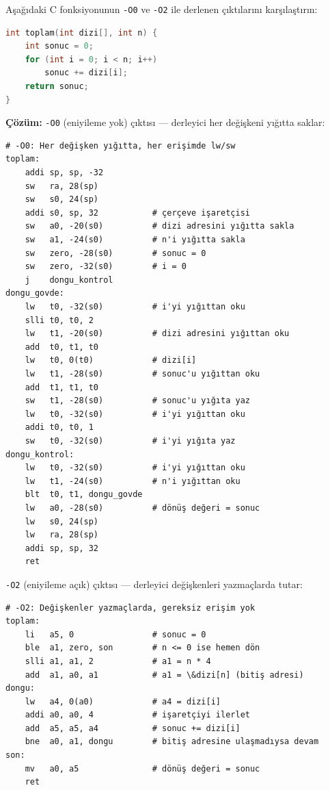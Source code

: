 \begin{ornek}[4.16]
\label{orn:eniyileme}
Aşağıdaki C fonksiyonunun \texttt{-O0} ve \texttt{-O2} ile derlenen çıktılarını karşılaştırın:

\begin{lstlisting}[language=C, style=alistirma-kod]
int toplam(int dizi[], int n) {
    int sonuc = 0;
    for (int i = 0; i < n; i++)
        sonuc += dizi[i];
    return sonuc;
}
\end{lstlisting}

\textbf{Çözüm:} \texttt{-O0} (eniyileme yok) çıktısı --- derleyici her değişkeni yığıtta saklar:

\begin{lstlisting}[style=riscv]
# -O0: Her değişken yığıtta, her erişimde lw/sw
toplam:
    addi sp, sp, -32
    sw   ra, 28(sp)
    sw   s0, 24(sp)
    addi s0, sp, 32           # çerçeve işaretçisi
    sw   a0, -20(s0)          # dizi adresini yığıtta sakla
    sw   a1, -24(s0)          # n'i yığıtta sakla
    sw   zero, -28(s0)        # sonuc = 0
    sw   zero, -32(s0)        # i = 0
    j    dongu_kontrol
dongu_govde:
    lw   t0, -32(s0)          # i'yi yığıttan oku
    slli t0, t0, 2
    lw   t1, -20(s0)          # dizi adresini yığıttan oku
    add  t0, t1, t0
    lw   t0, 0(t0)            # dizi[i]
    lw   t1, -28(s0)          # sonuc'u yığıttan oku
    add  t1, t1, t0
    sw   t1, -28(s0)          # sonuc'u yığıta yaz
    lw   t0, -32(s0)          # i'yi yığıttan oku
    addi t0, t0, 1
    sw   t0, -32(s0)          # i'yi yığıta yaz
dongu_kontrol:
    lw   t0, -32(s0)          # i'yi yığıttan oku
    lw   t1, -24(s0)          # n'i yığıttan oku
    blt  t0, t1, dongu_govde
    lw   a0, -28(s0)          # dönüş değeri = sonuc
    lw   s0, 24(sp)
    lw   ra, 28(sp)
    addi sp, sp, 32
    ret
\end{lstlisting}

\texttt{-O2} (eniyileme açık) çıktısı --- derleyici değişkenleri yazmaçlarda tutar:

\begin{lstlisting}[style=riscv]
# -O2: Değişkenler yazmaçlarda, gereksiz erişim yok
toplam:
    li   a5, 0                # sonuc = 0
    ble  a1, zero, son        # n <= 0 ise hemen dön
    slli a1, a1, 2            # a1 = n * 4
    add  a1, a0, a1           # a1 = \&dizi[n] (bitiş adresi)
dongu:
    lw   a4, 0(a0)            # a4 = dizi[i]
    addi a0, a0, 4            # işaretçiyi ilerlet
    add  a5, a5, a4           # sonuc += dizi[i]
    bne  a0, a1, dongu        # bitiş adresine ulaşmadıysa devam
son:
    mv   a0, a5               # dönüş değeri = sonuc
    ret
\end{lstlisting}


\end{ornek}

